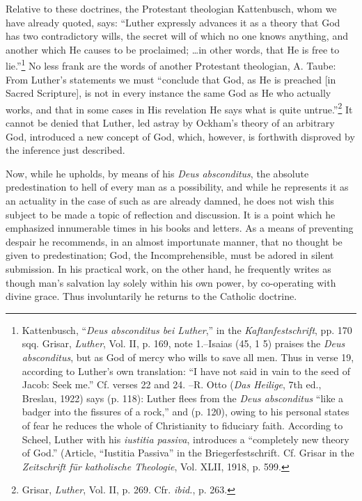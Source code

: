 Relative to these doctrines, the Protestant theologian Kattenbusch, whom
we have already quoted, says: “Luther expressly advances it as a theory that
God has two contradictory wills, the secret will of which no one knows anything,
and another which He causes to be proclaimed; \dots in other words,
that He is free to lie.”\footnote
{Kattenbusch, “\textit{Deus absconditus bei Luther},” in the \textit{Kaftanfestschrift}, pp. 170 sqq.
Grisar, \textit{Luther}, Vol. II, p. 169, note 1.--Isaias (45, 1 5) praises the \textit{Deus absconditus}, but as
God of mercy who wills to save all men. Thus in verse 19, according to Luther’s own
translation: “I have not said in vain to the seed of Jacob: Seek me.” Cf. verses 22 and 24.
--R. Otto (\textit{Das Heilige}, 7th ed., Breslau, 1922) says (p. 118): Luther flees from the \textit{Deus
absconditus} “like a badger into the fissures of a rock,” and (p. 120), owing to his personal
states of fear he reduces the whole of Christianity to fiduciary faith. According to Scheel,
Luther with his \textit{iustitia passiva}, introduces a “completely new theory of God.” (Article,
“Iustitia Passiva” in the Briegerfestschrift. Cf. Grisar in the \textit{Zeitschrift für katholische
Theologie}, Vol. XLII, 1918, p. 599.}
No less frank are the words of another Protestant
theologian, A. Taube: From Luther’s statements we must “conclude that God,
as He is preached [in Sacred Scripture], is not in every instance the same
God as He who actually works, and that in some cases in His revelation He
says what is quite untrue.”\footnote{Grisar, \textit{Luther}, Vol. II, p. 269. Cfr. \textit{ibid.}, p. 263.}
It cannot be denied that Luther, led astray by
Ockham’s theory of an arbitrary God, introduced a new concept of God,
which, however, is forthwith disproved by the inference just described.

Now, while he upholds, by means of his \textit{Deus absconditus}, the absolute
predestination to hell of every man as a possibility, and while he represents it
as an actuality in the case of such as are already damned, he does not wish
this subject to be made a topic of reflection and discussion. It is a point which
he emphasized innumerable times in his books and letters. As a means
of preventing despair he recommends, in an almost importunate manner, that no
thought be given to predestination; God, the Incomprehensible, must be
adored in silent submission. In his practical work, on the other hand, he frequently writes as though man’s salvation lay solely within his own power, by
co-operating with divine grace. Thus involuntarily he returns to the Catholic
doctrine.

